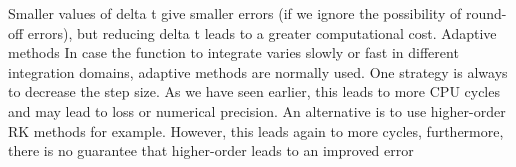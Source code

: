 \documentclass[a4paper,12pt, english]{article}
\begin{document}
Smaller values of delta t give smaller errors (if we ignore the possibility of round-off errors), but reducing delta t leads to a greater computational cost.
Adaptive methods
In case the function to integrate varies slowly or fast in different integration domains,
adaptive methods are normally used. One strategy is always to decrease the step size.
As we have seen earlier, this leads to more CPU cycles and may lead to loss or
numerical precision. An alternative is to use higher-order RK methods for example.
However, this leads again to more cycles, furthermore, there is no guarantee that
higher-order leads to an improved error
\end{document}
